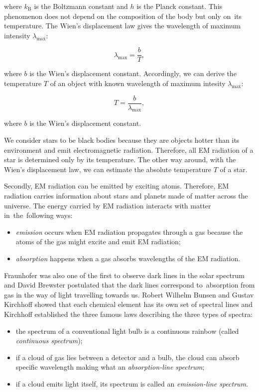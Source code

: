 where \(k_{\mathrm{B}}\) is the Boltzmann constant 
and \(h\) is the Planck constant.
This phenomenon does not depend on the composition of the body
but only on~its temperature.
The Wien's displacement law gives the wavelength of maximum intensity \(\lambda_{\max}\):

\begin{equation}
	\lambda_{\max} = \frac{b}{T},
\end{equation}

where \(b\) is the Wien's displacement constant.
Accordingly, we can derive the temperature \(T\) of an object
with known wavelength of maximum intesity \(\lambda_{\max}\):

\begin{equation}
	T = \frac{b}{\lambda_{\max}},
\end{equation}

where \(b\) is the Wien's displacement constant.~\cite{cochard2018}

We consider stars to be black bodies
because they are objects hotter than its environment
and emit electromagnetic radiation.
Therefore, all EM radiation of a star is determined only by its temperature.
The other way around, with the Wien's displacement law,
we can estimate the absolute temperature \(T\) of a star.~\cite{trypsteen2017}

Secondly, EM radiation can be emitted by exciting atoms.
Therefore, EM radiation carries information about stars and planets
made of matter across the universe.
The energy carried by EM radiation interacts with matter in~the~following ways:

\begin{itemize}
	\item \textit{emission} occurs when EM radiation propagates through a gas
		because the atoms of the gas might excite and emit EM radiation;
	\item \textit{absorption} happens when a gas absorbs wavelengths
		of the EM radiation.
\end{itemize}

Fraunhofer was also one of the first to observe dark lines in the solar spectrum
and David Brewster postulated that the dark lines correspond to~absorption from gas in the way of light travelling towards us.
Robert Wilhelm Bunsen and Gustav Kirchhoff showed that each chemical element has its own set of spectral lines
and Kirchhoff established the three famous laws describing the three types of spectra:

\begin{itemize}
	\item the spectrum of a conventional light bulb is a continuous rainbow (called \textit{continuous spectrum});
	\item if a cloud of gas lies between a detector and a bulb,
		the cloud can absorb specific wavelength making what an \textit{absorption-line spectrum};
	\item if a cloud emits light itself, its spectrum is called an \textit{emission-line spectrum}.
\end{itemize}

